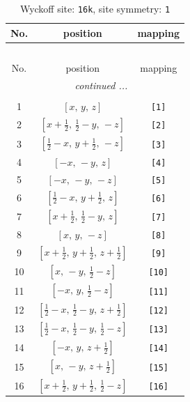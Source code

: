 \documentclass[fleqn,8pt]{jsarticle}
\begin{document}
\begin{longtable}{ccc}
\caption{Wyckoff site: {\tt 16k}, site symmetry: {\tt 1}}
 \\
 \hline \hline
No. & position & mapping \\ \hline \endfirsthead

\multicolumn{2}{l}{\tablename\ \thetable{}} \\
 \hline \hline
No. & position & mapping \\ \hline \endhead

 \hline \hline
\multicolumn{2}{r}{\footnotesize\it continued ...} \\ \endfoot

 \hline \hline
\multicolumn{2}{r}{} \\ \endlastfoot

1 & $\left[ x,\, y,\, z \right]$ & {\tt [1]} \\ \hline
2 & $\left[ x + \frac{1}{2},\, \frac{1}{2} - y,\, - z \right]$ & {\tt [2]} \\ \hline
3 & $\left[ \frac{1}{2} - x,\, y + \frac{1}{2},\, - z \right]$ & {\tt [3]} \\ \hline
4 & $\left[ - x,\, - y,\, z \right]$ & {\tt [4]} \\ \hline
5 & $\left[ - x,\, - y,\, - z \right]$ & {\tt [5]} \\ \hline
6 & $\left[ \frac{1}{2} - x,\, y + \frac{1}{2},\, z \right]$ & {\tt [6]} \\ \hline
7 & $\left[ x + \frac{1}{2},\, \frac{1}{2} - y,\, z \right]$ & {\tt [7]} \\ \hline
8 & $\left[ x,\, y,\, - z \right]$ & {\tt [8]} \\ \hline
9 & $\left[ x + \frac{1}{2},\, y + \frac{1}{2},\, z + \frac{1}{2} \right]$ & {\tt [9]} \\ \hline
10 & $\left[ x,\, - y,\, \frac{1}{2} - z \right]$ & {\tt [10]} \\ \hline
11 & $\left[ - x,\, y,\, \frac{1}{2} - z \right]$ & {\tt [11]} \\ \hline
12 & $\left[ \frac{1}{2} - x,\, \frac{1}{2} - y,\, z + \frac{1}{2} \right]$ & {\tt [12]} \\ \hline
13 & $\left[ \frac{1}{2} - x,\, \frac{1}{2} - y,\, \frac{1}{2} - z \right]$ & {\tt [13]} \\ \hline
14 & $\left[ - x,\, y,\, z + \frac{1}{2} \right]$ & {\tt [14]} \\ \hline
15 & $\left[ x,\, - y,\, z + \frac{1}{2} \right]$ & {\tt [15]} \\ \hline
16 & $\left[ x + \frac{1}{2},\, y + \frac{1}{2},\, \frac{1}{2} - z \right]$ & {\tt [16]} \\
\end{longtable}
\end{document}
